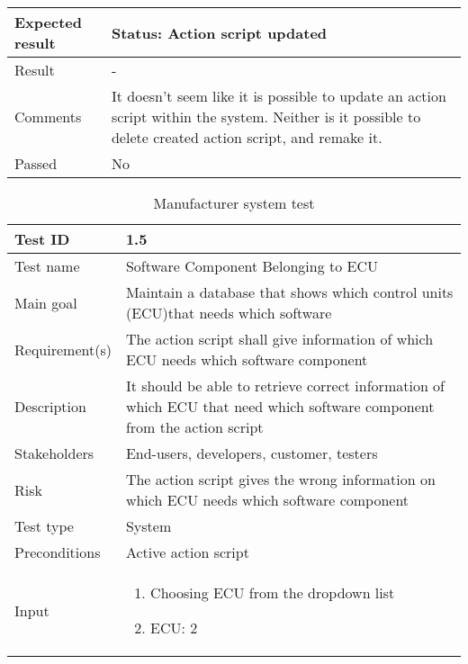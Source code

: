 \begin{table}[H]
\begin{tabularx}{1.0\textwidth}{
    |p{}     %
    |p{}|    %
}
Expected result
& Status: Action script updated
\\
\hline

Result
& -
\\
\hline

Comments
& It doesn't seem like it is possible to update an action script within the system. Neither is it possible to delete created action script, and remake it.
\\
\hline

Passed
& No
\\
\hline

\end{tabularx}
\end{table}

\begin{table}[H]
\centering
\caption{Manufacturer system test}
\begin{tabularx}{1.0\textwidth}{
    |p{}     %
    |p{}|    %
}
\hline

Test ID
& 1.5
\\
\hline

Test name
& Software Component Belonging to ECU
\\
\hline

Main goal
& Maintain a database that shows which control units (ECU)that needs which software
\\
\hline

Requirement(s)
& The action script shall give information of which ECU needs which software component
\\
\hline

Description
& It should be able to retrieve correct information of which ECU that need which software component from the action script
\\
\hline

Stakeholders
& End-users, developers, customer, testers
\\
\hline

Risk
& The action script gives the wrong information on which ECU needs which software component
\\
\hline

Test type
& System
\\
\hline

Preconditions
& Active action script
\\
\hline

Input
& \begin{enumerate}
    \item Choosing ECU from the dropdown list
    \item ECU: 2
\end{enumerate}
\\
\hline


\end{tabularx}
\end{table}
